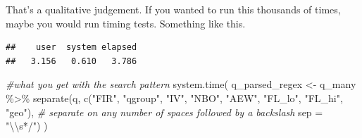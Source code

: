 \documentclass[
]{book}
\newenvironment{Shaded}{\begin{snugshade}}{\end{snugshade}}
\newcommand{\AttributeTok}[1]{\textcolor[rgb]{0.77,0.63,0.00}{#1}}
\newcommand{\CommentTok}[1]{\textcolor[rgb]{0.56,0.35,0.01}{\textit{#1}}}
\newcommand{\DecValTok}[1]{\textcolor[rgb]{0.00,0.00,0.81}{#1}}
\newcommand{\FunctionTok}[1]{\textcolor[rgb]{0.00,0.00,0.00}{#1}}
\newcommand{\NormalTok}[1]{#1}
\newcommand{\OtherTok}[1]{\textcolor[rgb]{0.56,0.35,0.01}{#1}}
\newcommand{\SpecialCharTok}[1]{\textcolor[rgb]{0.00,0.00,0.00}{#1}}
\newcommand{\StringTok}[1]{\textcolor[rgb]{0.31,0.60,0.02}{#1}}
\begin{document}
That's a qualitative judgement. If you wanted to run this thousands of times, maybe you would run timing tests. Something like this.

\begin{Shaded}
\end{Shaded}

\begin{verbatim}
##    user  system elapsed 
##   3.156   0.610   3.786
\end{verbatim}

\begin{Shaded}
\begin{Highlighting}[]
\CommentTok{\#what you get with the search pattern}
\FunctionTok{system.time}\NormalTok{(}
\NormalTok{q\_parsed\_regex }\OtherTok{\textless{}{-}}\NormalTok{ q\_many }\SpecialCharTok{\%\textgreater{}\%} 
  \FunctionTok{separate}\NormalTok{(q,}
            \FunctionTok{c}\NormalTok{(}\StringTok{"FIR"}\NormalTok{, }\StringTok{"qgroup"}\NormalTok{, }\StringTok{"IV"}\NormalTok{, }\StringTok{"NBO"}\NormalTok{, }\StringTok{"AEW"}\NormalTok{, }\StringTok{"FL\_lo"}\NormalTok{, }\StringTok{"FL\_hi"}\NormalTok{, }\StringTok{"geo"}\NormalTok{),}
           \CommentTok{\# separate on any number of spaces followed by a backslash}
            \AttributeTok{sep =} \StringTok{"}\SpecialCharTok{\textbackslash{}\textbackslash{}}\StringTok{s*/"}\NormalTok{)}
\NormalTok{)}
\end{Highlighting}
\end{Shaded}
\end{document}
